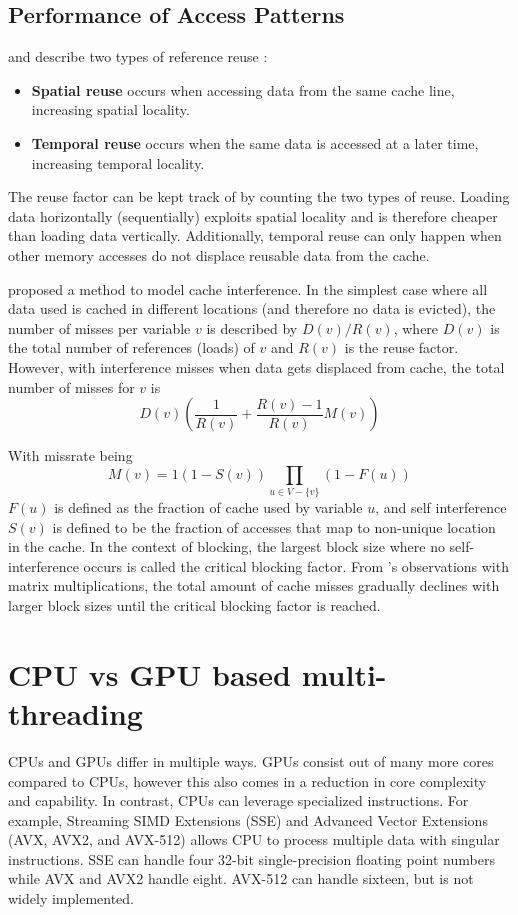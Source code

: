 \subsection{Performance of Access Patterns}
\citeauthor{lam1991cache} and \citeauthor{meyer2003algorithms} describe two types of reference reuse \cite{lam1991cache, meyer2003algorithms}:
\begin{itemize}
    \item \textbf{Spatial reuse} occurs when accessing data from the same cache line, increasing spatial locality.
    \item \textbf{Temporal reuse} occurs when the same data is accessed at a later time, increasing temporal locality.
\end{itemize}
The reuse factor can be kept track of by counting the two types of reuse.
Loading data horizontally (sequentially) exploits spatial locality and is therefore cheaper than loading data vertically.
Additionally, temporal reuse can only happen when other memory accesses do not displace reusable data from the cache.

\citeauthor{lam1991cache} proposed a method to model cache interference.
In the simplest case where all data used is cached in different locations (and therefore no data is evicted), the number of misses per variable $v$ is described by $D(v)/R(v)$, where $D(v)$ is the total number of references (loads) of $v$ and $R(v)$ is the reuse factor.
However, with interference misses when data gets displaced from cache, the total number of misses for $v$ is
\[
    D(v)\left(\frac{1}{R(v)}+\frac{R(v)-1}{R(v)}M(v)\right)
\]

With missrate being
\[
    M(v) = 1 \left(1 - S(v)\right) \prod_{u\in V - \{v\}}\left(1 - F(u)\right)
\]
$F(u)$ is defined as the fraction of cache used by variable $u$, and self interference $S(v)$ is defined to be the fraction of accesses that map to non-unique location in the cache.
In the context of blocking, the largest block size where no self-interference occurs is called the critical blocking factor.
From \citeauthor{lam1991cache}'s observations with matrix multiplications, the total amount of cache misses gradually declines with larger block sizes until the critical blocking factor is reached.



\section{CPU vs GPU based multi-threading}
CPUs and GPUs differ in multiple ways.
GPUs consist out of many more cores compared to CPUs, however this also comes in a reduction in core complexity and capability.
In contrast, CPUs can leverage specialized instructions.
For example, Streaming SIMD Extensions (SSE) and Advanced Vector Extensions (AVX, AVX2, and AVX-512) allows CPU to process multiple data with singular instructions.
SSE can handle four 32-bit single-precision floating point numbers while AVX and AVX2 handle eight.
AVX-512 can handle sixteen, but is not widely implemented.


